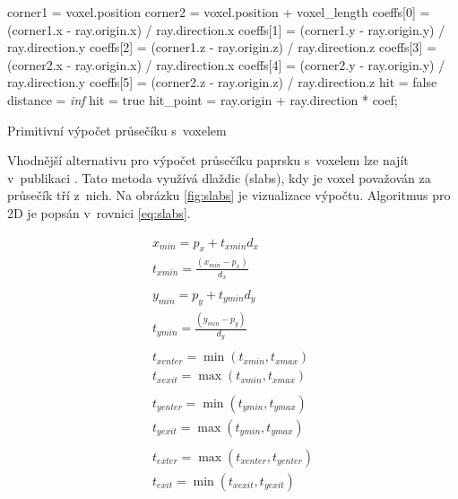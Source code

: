 \begin{center}
	\begin{czechalgorithm}[H] \label{alg:ray_box_primitive}
		corner1 = voxel.position\;
		corner2 = voxel.position + voxel\_length\;
		coeffs[0] = (corner1.x - ray.origin.x) / ray.direction.x\;
		coeffs[1] = (corner1.y - ray.origin.y) / ray.direction.y\;
		coeffs[2] = (corner1.z - ray.origin.z) / ray.direction.z\;
		coeffs[3] = (corner2.x - ray.origin.x) / ray.direction.x\;
		coeffs[4] = (corner2.y - ray.origin.y) / ray.direction.y\;
		coeffs[5] = (corner2.z - ray.origin.z) / ray.direction.z\;
		hit = false\;
		distance = \textit{inf}\;
		 {
			 {
				hit = true\;
				hit\_point = ray.origin + ray.direction * coef;\;
			}
		}
		\caption{Primitivní výpočet průsečíku s~voxelem}
	\end{czechalgorithm}
\end{center}

Vhodnější alternativu pro výpočet průsečíku paprsku s~voxelem lze najít v~publikaci \cite{efficient_box_intersect}. Tato metoda využívá dlaždic (slabs), kdy je voxel považován za průsečík tří z~nich. Na obrázku \ref{fig:slabs} je vizualizace výpočtu. Algoritmus pro 2D je popsán v~rovnici \ref{eq:slabs}.


\begin{equation} \label{eq:slabs}
	\begin{gathered}
		x_{min} = p_x + t_{xmin} d_x\\
		t_{xmin} = \frac{(x_{min} - p_x)}{d_x}\\
		\\
		y_{min} = p_y + t_{ymin} d_y\\
		t_{ymin} = \frac{(y_{min} - p_y)}{d_y}\\
		\\
		t_{xenter} = \min(t_{xmin}, t_{xmax})\\
		t_{xexit} = \max(t_{xmin}, t_{xmax})\\
		\\
		t_{yenter} = \min(t_{ymin}, t_{ymax})\\
		t_{yexit} = \max(t_{ymin}, t_{ymax})\\
		\\
		t_{exter} = \max(t_{xenter}, t_{yenter})\\
		t_{exit} = \min(t_{xexit}, t_{yexit})\\
	\end{gathered}
\end{equation}

